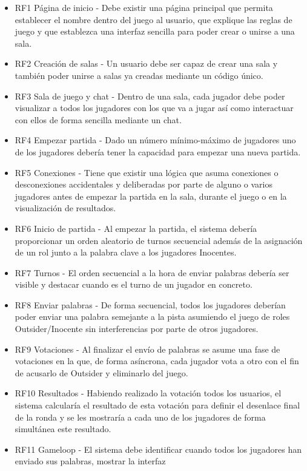 \begin{itemize}
	\item RF1 Página de inicio - Debe existir una página principal que permita establecer el nombre dentro del juego al usuario,
	      que explique las reglas de juego y que establezca una interfaz sencilla para poder crear o unirse a una sala.
	\item RF2 Creación de salas - Un usuario debe ser capaz de crear una sala y también poder unirse a salas ya creadas mediante un
	      código único.
	\item RF3 Sala de juego y chat - Dentro de una sala, cada jugador debe poder visualizar a todos los jugadores con los que va a jugar
	      así como interactuar con ellos de forma sencilla mediante un chat.
	\item RF4 Empezar partida - Dado un número mínimo-máximo de jugadores uno de los jugadores debería tener la capacidad
	      para empezar una nueva partida.
	\item RF5 Conexiones - Tiene que existir una lógica que asuma conexiones o desconexiones accidentales y deliberadas por parte
	      de alguno o varios jugadores antes de empezar la partida en la sala, durante el juego o en la visualización de resultados.
	\item RF6 Inicio de partida - Al empezar la partida, el sistema debería proporcionar un orden aleatorio de turnos secuencial además de
	      la asignación de un rol junto a la palabra clave a los jugadores Inocentes.
	\item RF7 Turnos - El orden secuencial a la hora de enviar palabras debería ser visible y destacar cuando es el turno
	      de un jugador en concreto.
	\item RF8 Enviar palabras - De forma secuencial, todos los jugadores deberían poder enviar una palabra semejante a la pista asumiendo
	      el juego de roles Outsider/Inocente sin interferencias por parte de otros jugadores.
	\item RF9 Votaciones - Al finalizar el envío de palabras se asume una fase de votaciones en la que, de forma asíncrona,
	      cada jugador vota a otro con el fin de acusarlo de Outsider y eliminarlo del juego.
	\item RF10 Resultados - Habiendo realizado la votación todos los usuarios, el sistema calcularía el resultado de esta votación para definir el
	      desenlace final de la ronda y se les mostraría a cada uno de los jugadores de forma simultánea este resultado.
	\item RF11 Gameloop - El sistema debe identificar cuando todos los jugadores han enviado sus palabras, mostrar la interfaz

\end{itemize}
